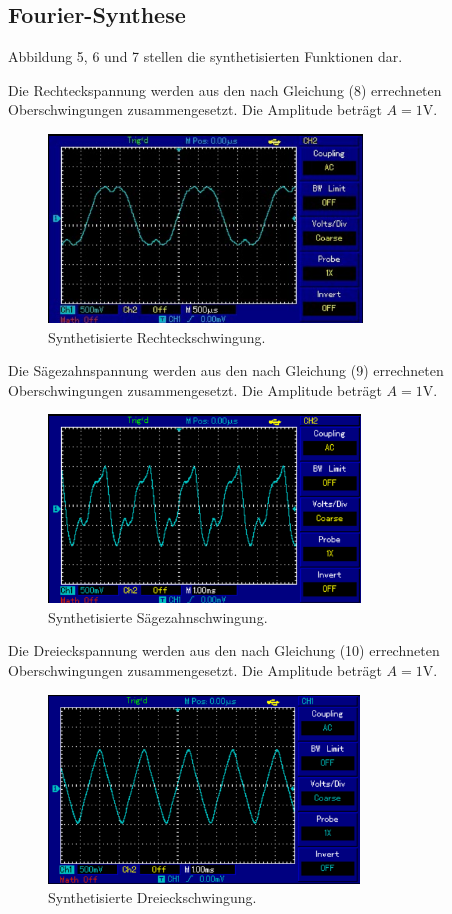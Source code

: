 \subsection{Fourier-Synthese}

Abbildung 5, 6 und 7 stellen die synthetisierten Funktionen dar.
\pagebreak

Die Rechteckspannung werden aus den nach Gleichung (8) errechneten Oberschwingungen zusammengesetzt.
Die Amplitude beträgt $A = 1$V.

\begin{figure}[H]
  \centering
  \includegraphics[height=5cm]{rechteck.PNG}
  \caption{Synthetisierte Rechteckschwingung.}
  \label{fig:rechteck}
\end{figure}

Die Sägezahnspannung werden aus den nach Gleichung (9) errechneten Oberschwingungen zusammengesetzt.
Die Amplitude beträgt $A = 1$V.

\begin{figure}[H]
  \centering
  \includegraphics[height=5cm]{saegezahn.PNG}
  \caption{Synthetisierte Sägezahnschwingung.}
  \label{fig:saegezahn}
\end{figure}

\pagebreak

Die Dreieckspannung werden aus den nach Gleichung (10) errechneten Oberschwingungen zusammengesetzt.
Die Amplitude beträgt $A = 1$V.

\begin{figure}[H]
  \centering
  \includegraphics[height=5cm]{dreieck.PNG}
  \caption{Synthetisierte Dreieckschwingung.}
  \label{fig:dreieck}
\end{figure}
